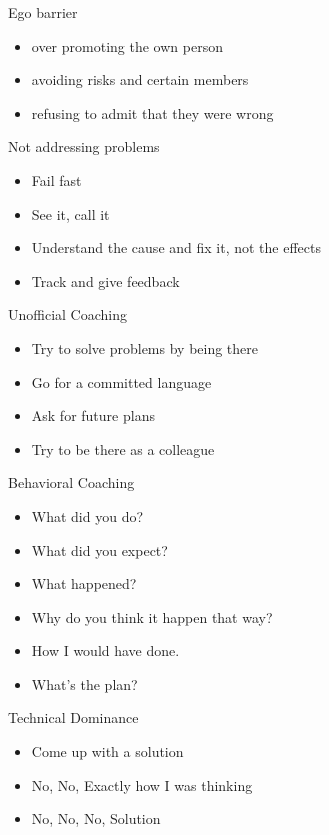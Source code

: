 \documentclass{beamer}
\begin{document}
\begin{frame}{Ego barrier}
\begin{itemize}
\item over promoting the own person
\item avoiding risks and certain members
\item refusing to admit that they were wrong
\end{itemize}
\end{frame}

\begin{frame}{Not addressing problems}
\begin{itemize}
\item Fail fast
\item See it, call it
\item Understand the cause and fix it, not the effects
\item Track and give feedback
\end{itemize}
\end{frame}

\begin{frame}{Unofficial Coaching}
\begin{itemize}
\item Try to solve problems by being there
\item Go for a committed language
\item Ask for future plans
\item Try to be there as a colleague
\end{itemize}
\end{frame}

\begin{frame}{Behavioral Coaching}
\begin{itemize}
\item What did you do?
\item What did you expect?
\item What happened?
\item Why do you think it happen that way?
\item How I would have done.
\item What's the plan?
\end{itemize}
\end{frame}

\begin{frame}{Technical Dominance}
\begin{itemize}
\item Come up with a solution
\item No, No, Exactly how I was thinking
\item No, No, No, Solution
\end{itemize}
\end{frame}
\end{document}
